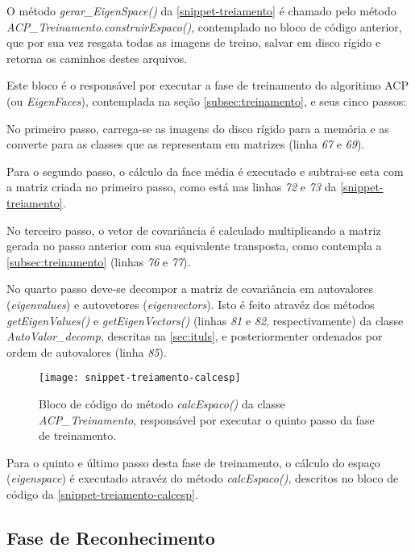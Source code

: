 O método \textit{gerar\_EigenSpace()} da \autoref{snippet-treiamento} é chamado pelo método \textit{ACP\_Treinamento.construirEspaco()}, contemplado no bloco de código anterior, que por sua vez resgata todas as imagens de treino, salvar em disco rígido e retorna os caminhos destes arquivos.

Este bloco é o responsável por executar a fase de treinamento do algoritimo ACP (ou \textit{EigenFaces}), contemplada na seção \autoref{subsec:treinamento}, e seus cinco passos:

No primeiro passo, carrega-se as imagens do disco rígido para a memória e as converte para as classes que as representam em matrizes (linha \textit{67} e \textit{69}). 

Para o segundo passo, o cálculo da face média é executado e subtrai-se esta com a matriz criada no primeiro passo, como está nas linhas \textit{72} e \textit{73} da  \autoref{snippet-treiamento}.

No terceiro passo, o vetor de covariância é calculado multiplicando a matriz gerada no passo anterior com sua equivalente transposta, como contempla a \autoref{subsec:treinamento} (linhas \textit{76} e \textit{77}).

No quarto passo deve-se decompor a matriz de covariância em autovalores (\textit{eigenvalues}) e autovetores (\textit{eigenvectors}). Isto é feito atravéz dos métodos \textit{getEigenValues()} e \textit{getEigenVectors()} (linhas \textit{81} e \textit{82}, respectivamente) da classe \textit{AutoValor\_decomp}, descritas na \autoref{sec:ituls}, e posteriormenter ordenados por ordem de autovalores (linha \textit{85}).

\begin{figure}[h]
	\centering
	\texttt{[image: snippet-treiamento-calcesp]}
	\caption{Bloco de código do método \textit{calcEspaco()} da classe \textit{ACP\_Treinamento}, responsável por executar o quinto passo da fase de treinamento.}
	\label{snippet-treiamento-calcesp}
\end{figure}

Para o quinto e último passo desta fase de treinamento, o cálculo do espaço (\textit{eigenspace}) é executado atravéz do método \textit{calcEspaco()}, descritos no bloco de código da \autoref{snippet-treiamento-calcesp}. 





\subsection{Fase de Reconhecimento}\label{sec:implrecog}

